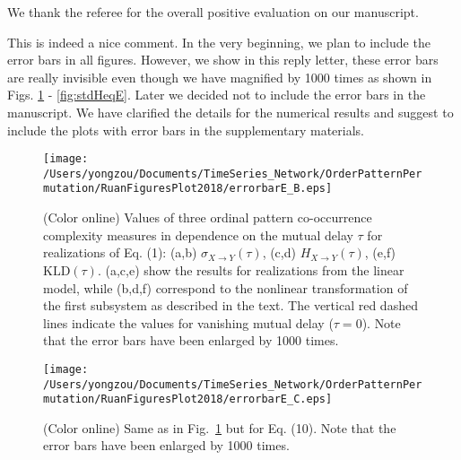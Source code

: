 \documentclass[aps,chaos,superscriptaddress,showkeys]{revtex4}
\begin{document}
\begin{center}
\begin{minipage}[c]{0.9\textwidth}
We thank the referee for the overall positive evaluation on our manuscript. 
\end{minipage}
\end{center}




\begin{center}
\begin{minipage}[c]{0.9\textwidth}
This is indeed a nice comment. In the very beginning, we plan to include the error bars in all figures. However, we show in this reply letter, these error bars are really invisible even though we have magnified by 1000 times as shown in Figs. \ref{fig:stdHeqB} - \ref{fig:stdHeqE}. Later we decided not to include the error bars in the manuscript. We have clarified the details for the numerical results and suggest to include the plots with error bars in the supplementary materials. 

\end{minipage}
\end{center}
\begin{figure}
	\centering
	\texttt{[image: /Users/yongzou/Documents/TimeSeries\_Network/OrderPatternPermutation/RuanFiguresPlot2018/errorbarE\_B.eps]}
\caption{(Color online) Values of three ordinal pattern co-occurrence complexity measures in dependence on the mutual delay $\tau$ for realizations of Eq. (1): (a,b) $\sigma_{X\to Y}(\tau)$, (c,d) $H_{X \to Y}(\tau)$, (e,f) $\text{KLD}(\tau)$. (a,c,e) show the results for realizations from the linear model, while (b,d,f) correspond to the nonlinear transformation of the first subsystem as described in the text. The vertical red dashed lines indicate the values for vanishing mutual delay ($\tau=0$). {\color{red}Note that the error bars have been enlarged by 1000 times.} \label{fig:stdHeqB}}
\end{figure}

\begin{figure}
	\centering
	\texttt{[image: /Users/yongzou/Documents/TimeSeries\_Network/OrderPatternPermutation/RuanFiguresPlot2018/errorbarE\_C.eps]}
\caption{(Color online) Same as in Fig.~\ref{fig:stdHeqB} but for Eq. (10). {\color{red}Note that the error bars have been enlarged by 1000 times.} \label{fig:stdHeqC}}
\end{figure}
\end{document}

